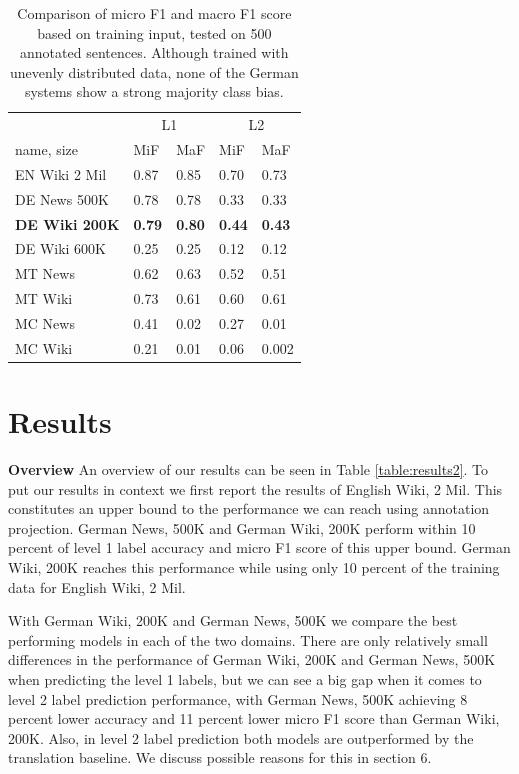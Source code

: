 \documentclass[11pt,a4paper]{article}
\begin{document}
\begin{table}[h]
\begin{tabular}{l|l|l||l|l}
 &\multicolumn{2}{c}{L1}&\multicolumn{2}{c}{L2} \\
name, size  &MiF & MaF  &MiF  & MaF  \\\hline
\hline
EN Wiki 2 Mil & 0.87 & 0.85 & 0.70 & 0.73\\
\hline
DE News 500K & 0.78 & 0.78 &0.33 &0.33 \\
\textbf{DE Wiki 200K } & \textbf{0.79 }& \textbf{0.80} & \textbf{0.44}& \textbf{0.43}\\ 
DE Wiki 600K & 0.25 & 0.25 & 0.12 & 0.12\\
\hline
MT News & 0.62 & 0.63  &0.52&0.51\\
MT Wiki & 0.73 & 0.61 &0.60&0.61\\
MC News & 0.41 & 0.02 & 0.27& 0.01 \\
MC Wiki  & 0.21 & 0.01  & 0.06& 0.002
\end{tabular}
\caption{Comparison of micro F1 and macro F1 score based on training input, tested on 500 annotated sentences. Although trained with unevenly distributed data, none of the German systems show a strong majority class bias.}
\label{table:results}
\end{table}



\section{Results}
\textbf{Overview} An overview of our results can be seen in Table \ref{table:results2}. To put our results in context we first report the results of English Wiki, 2 Mil. This constitutes an upper bound to the performance we can reach using annotation projection. German News, 500K and German Wiki, 200K perform within 10 percent of level 1 label accuracy and micro F1 score of this upper bound. German Wiki, 200K reaches this performance while using only 10 percent of the training data for English Wiki, 2 Mil. 

With German Wiki, 200K and German News, 500K we compare the best performing models in each of the two domains. There are only relatively small differences in the performance of German Wiki, 200K and German News, 500K when predicting the level 1 labels, but we can see a big gap when it comes to level 2 label prediction performance, with German News, 500K achieving 8 percent lower accuracy and 11 percent lower micro F1 score than German Wiki, 200K. Also, in level 2 label prediction both models are outperformed by the translation baseline. We discuss possible reasons for this in section 6.
\end{document}
